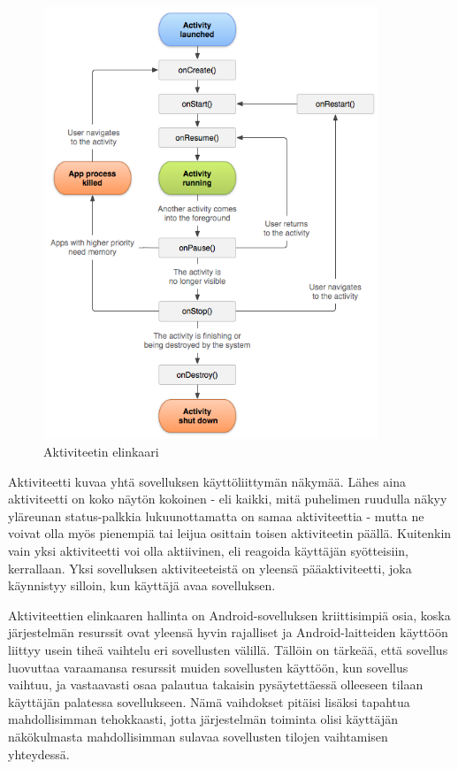 \begin{figure}[htb]
\includegraphics[width=100mm]{activity_lifecycle.png}
\caption{Aktiviteetin elinkaari} \label{activity_lifecycle}
\end{figure}

Aktiviteetti kuvaa yhtä sovelluksen käyttöliittymän näkymää. Lähes aina aktiviteetti on koko näytön kokoinen - eli kaikki, mitä puhelimen ruudulla näkyy yläreunan status-palkkia lukuunottamatta on samaa aktiviteettia - mutta ne voivat olla myös pienempiä tai leijua osittain toisen aktiviteetin päällä. Kuitenkin vain yksi aktiviteetti voi olla aktiivinen, eli reagoida käyttäjän syötteisiin, kerrallaan. Yksi sovelluksen aktiviteeteistä on yleensä pääaktiviteetti, joka käynnistyy silloin, kun käyttäjä avaa sovelluksen. 

Aktiviteettien elinkaaren hallinta on Android-sovelluksen kriittisimpiä osia, koska järjestelmän resurssit ovat yleensä hyvin rajalliset ja Android-laitteiden käyttöön liittyy usein tiheä vaihtelu eri sovellusten välillä. Tällöin on tärkeää, että sovellus luovuttaa varaamansa resurssit muiden sovellusten käyttöön, kun sovellus vaihtuu, ja vastaavasti osaa palautua takaisin pysäytettäessä olleeseen tilaan käyttäjän palatessa sovellukseen. Nämä vaihdokset pitäisi lisäksi tapahtua mahdollisimman tehokkaasti, jotta järjestelmän toiminta olisi käyttäjän näkökulmasta mahdollisimman sulavaa sovellusten tilojen vaihtamisen yhteydessä.

